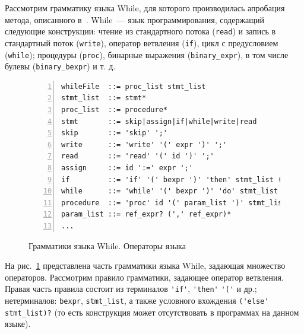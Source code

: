 Рассмотрим грамматику языка While, для которого производилась апробация метода, описанного в~\cite{paper:while}.
While~--- язык программирования, содержащий следующие конструкции: чтение из стандартного потока (\lstinline{read}) и запись в стандартный поток (\lstinline{write}), оператор ветвления (\lstinline{if}), цикл с предусловием (\lstinline{while}); процедуры (\lstinline{proc}), бинарные выражения (\lstinline{binary_expr}), в том числе булевы (\lstinline{binary_bexpr}) и т. д.
\begin{figure}[h]
    \begin{lstlisting}[numbers=left, numbersep=3pt, basicstyle=\ttfamily\small, numberstyle=\tiny, frame=bottom, language={}]
whileFile  ::= proc_list stmt_list
stmt_list  ::= stmt*
proc_list  ::= procedure*
stmt       ::= skip|assign|if|while|write|read
skip       ::= 'skip' ';'
write      ::= 'write' '(' expr ')' ';'
read       ::= 'read' '(' id ')' ';'
assign     ::= id ':=' expr ';'
if         ::= 'if' '(' bexpr ')' 'then' stmt_list ('else' stmt_list)? 'fi'
while      ::= 'while' '(' bexpr ')' 'do' stmt_list 'od'
procedure  ::= 'proc' id '(' param_list ')' stmt_list 'endp'
param_list ::= ref_expr? (',' ref_expr)*
...
 \end{lstlisting}
    \caption{Грамматики языка While. Операторы языка}
    \label{ov:whileI}
\end{figure}
\noindent
На рис.~\ref{ov:whileI} представлена часть грамматики языка While, задающая множество операторов.
Рассмотрим правило грамматики, задающее оператор ветвления.
Правая часть правила состоит из терминалов \lstinline{'if'}, \lstinline{'then'} \lstinline{'('} и др.; нетерминалов: \lstinline{bexpr}, \lstinline{stmt_list}, а также условного вхождения \lstinline{('else' stmt_list)?} (то есть конструкция может отсутствовать в программах на данном языке).
